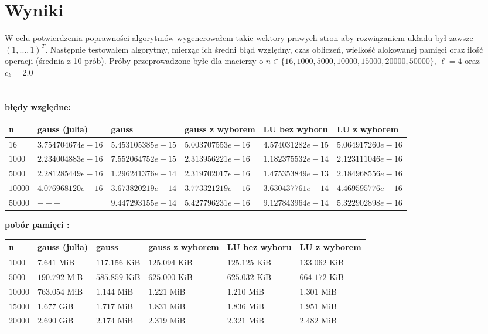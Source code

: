 \documentclass{article}
\begin{document}
\section*{Wyniki}
W celu potwierdzenia poprawności algorytmów wygenerowałem takie wektory prawych stron aby rozwiązaniem układu był zawsze $(1,...,1)^T$. Następnie testowałem algorytmy, mierząc ich średni błąd względny, czas obliczeń, wielkość alokowanej pamięci oraz ilość operacji (średnia z 10 prób). Próby przeprowadzone byłe dla macierzy o $n \in \{16,1000,5000,10000,15000,20000,50000\}$, $\ell=4$ oraz $c_k=2.0$\\\\\\
\noindent \textbf{błędy względne:}
\begin{center}
	\begin{tabular}{|p{1cm}|p{3cm}|p{3cm}|p{3cm}|p{3cm}|p{3cm}|}
		\hline
		\textbf{n} & \textbf{gauss (julia)} & \textbf{gauss} & \textbf{gauss z wyborem} & \textbf{LU bez wyboru} & \textbf{LU z wyborem}  \\
		\hline
		$16$ & $3.754704674e-16$ & $5.453105385e-15$ & $5.003707553e-16$ & $4.574031282e-15$ & $5.064917260e-16$  \\
		\hline
		$1000$ & $2.234004883e-16$ & $7.552064752e-15$ & $2.313956221e-16$ & $1.182375532e-14$ & $2.123111046e-16$ \\
		\hline
		$5000$ & $2.281285449e-16$ & $1.296241376e-14$ & $2.319702017e-16$ & $1.475353849e-13$ & $2.184968556e-16$ \\
		\hline
		$10000$ & $4.076968120e-16$ & $3.673820219e-14$ & $3.773321219e-16$ & $3.630437761e-14$ & $4.469595776e-16$  \\
		\hline
		$50000$ & $---$ & $9.447293155e-14$ & $5.427796231e-16$ & $9.127843964e-14$ & $5.322902898e-16$ \\
		\hline
	\end{tabular}
\end{center}
\vspace{0.8cm}
\noindent \textbf{pobór pamięci :}
\begin{center}
	\begin{tabular}{|p{1cm}|p{3cm}|p{3cm}|p{3cm}|p{3cm}|p{3cm}|}
		\hline
		\textbf{n} & \textbf{gauss (julia)} & \textbf{gauss} & \textbf{gauss z wyborem} & \textbf{LU bez wyboru} & \textbf{LU z wyborem}  \\
		\hline
		$1000$ & $7.641$ MiB & $117.156$ KiB & $125.094$ KiB & $125.125$ KiB & $133.062$ KiB \\
		\hline
		$5000$ & $190.792$ MiB & $585.859$ KiB & $625.000$ KiB & $625.032$ KiB & $664.172$ KiB \\
		\hline
		$10000$ & $763.054$ MiB & $1.144$ MiB & $1.221$ MiB & $1.210$ MiB & $1.301$ MiB  \\
		\hline
		$15000$ & $1.677$  GiB & $1.717$ MiB & $1.831$ MiB & $1.836$ MiB & $1.951$ MiB  \\
		\hline
		$20000$ & $2.690$  GiB & $2.174$ MiB & $2.319$ MiB & $2.321$ MiB & $2.482$ MiB \\
		\hline
	\end{tabular}
\end{center}
\end{document}

